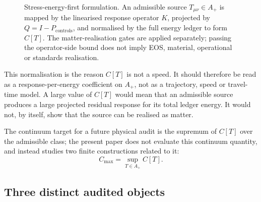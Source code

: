 \documentclass[11pt,a4paper]{article}
\begin{document}
\begin{figure}[ht]
\centering
{}
\caption{Stress-energy-first formulation. An admissible source $T_{\mu\nu}\in A_{+}$ is mapped by the linearised response operator $K$, projected by $Q=I-P_{\mathrm{controls}}$, and normalised by the full energy ledger to form $C[T]$. The matter-realisation gates are applied separately; passing the operator-side bound does not imply EOS, material, operational or standards realisation.}
\label{fig:flow}
\end{figure}

This normalisation is the reason $C[T]$ is not a speed. It should therefore be read as a response-per-energy coefficient on $A_{+}$, not as a trajectory, speed or travel-time model. A large value of $C[T]$ would mean that an admissible source produces a large projected residual response for its total ledger energy. It would not, by itself, show that the source can be realised as matter.

The continuum target for a future physical audit is the supremum of $C[T]$ over the admissible class; the present paper does not evaluate this continuum quantity, and instead studies two finite constructions related to it:
\[
C_{\mathrm{max}} = \sup_{T \in A_{+}} C[T].
\]
\subsection{Three distinct audited objects}
\end{document}
